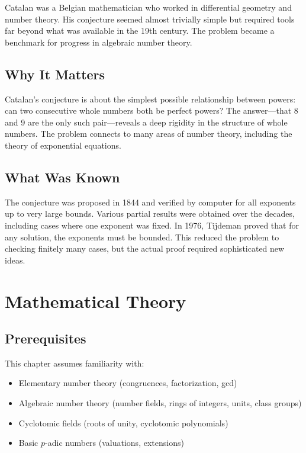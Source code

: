 \begin{historicalbox}
Catalan was a Belgian mathematician who worked in differential geometry and number theory. His conjecture seemed almost trivially simple but required tools far beyond what was available in the 19th century. The problem became a benchmark for progress in algebraic number theory.
\end{historicalbox}

\subsection{Why It Matters}
Catalan's conjecture is about the simplest possible relationship between powers: can two consecutive whole numbers both be perfect powers? The answer---that 8 and 9 are the only such pair---reveals a deep rigidity in the structure of whole numbers. The problem connects to many areas of number theory, including the theory of exponential equations.

\subsection{What Was Known}
The conjecture was proposed in 1844 and verified by computer for all exponents up to very large bounds. Various partial results were obtained over the decades, including cases where one exponent was fixed. In 1976, Tijdeman proved that for any solution, the exponents must be bounded. This reduced the problem to checking finitely many cases, but the actual proof required sophisticated new ideas.

\section{Mathematical Theory}


\subsection{Prerequisites}
This chapter assumes familiarity with:
\begin{itemize}
\item Elementary number theory (congruences, factorization, gcd)
\item Algebraic number theory (number fields, rings of integers, units, class groups)
\item Cyclotomic fields (roots of unity, cyclotomic polynomials)
\item Basic $p$-adic numbers (valuations, extensions)
\end{itemize}

